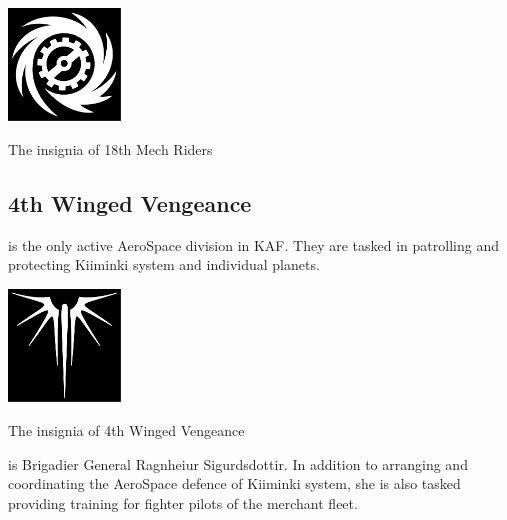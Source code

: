 \documentclass{tufte-book}
\begin{document}
\bigskip
{}

\begin{marginfigure}[0\baselineskip]
  \includegraphics[width=3cm]{overdrive}
  \caption{The insignia of 18th Mech Riders}
  \label{fig:mech_riders}
\end{marginfigure}

\subsection{4th Winged Vengeance}

 is the only active AeroSpace division in
KAF. They are tasked in patrolling and protecting Kiiminki system and
individual planets.

\begin{marginfigure}[0\baselineskip]
  \includegraphics[width=3cm]{evil-wings}
  \caption{The insignia of 4th Winged Vengeance}
  \label{fig:winged_vengeance}
\end{marginfigure}

 is Brigadier General
Ragnhei\dh ur Sigurdsdottir. In addition to arranging and coordinating the
AeroSpace defence of Kiiminki system, she is also tasked providing training
for fighter pilots of the merchant fleet.
\end{document}
